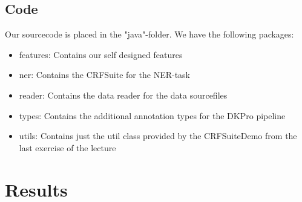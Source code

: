 \documentclass[noindent, nochapname]{tudexercise}
\begin{document}
		\subsection{Code}
			Our sourcecode is placed in the "java"-folder. We have the following packages:
			\begin{itemize}
			\item features: Contains our self designed features
			
			\item ner: Contains the CRFSuite for the NER-task
			
			\item reader: Contains the data reader for the data sourcefiles
			
			\item types: Contains the additional annotation types for the DKPro pipeline
			
			\item utils: Contains just the util class provided by the CRFSuiteDemo from the last exercise of the lecture
			\end{itemize}			 
	
	\newpage
	\appendix
		\section{Results}\label{app:results}\centering
			
\end{document}
